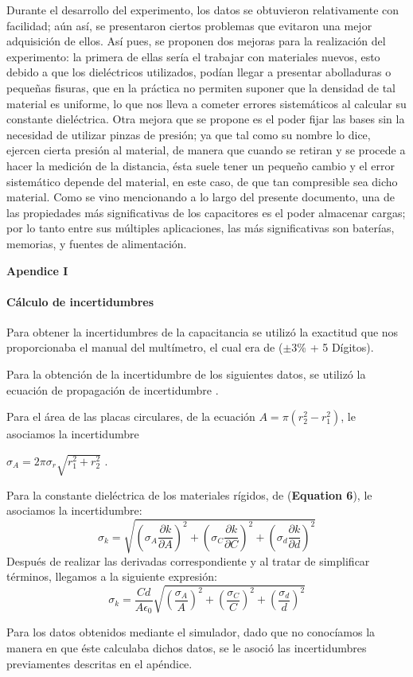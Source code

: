 \documentclass[letterpaper, 11 pt]{article}
\begin{document}
\begin{multicols}{2}
Durante el desarrollo del experimento, los datos se obtuvieron relativamente con facilidad; aún así, se presentaron ciertos problemas que evitaron una mejor adquisición de ellos. Así pues, se proponen dos mejoras para la realización del experimento: la primera de ellas sería el trabajar con materiales nuevos, esto debido a que los dieléctricos utilizados, podían llegar a presentar abolladuras o pequeñas fisuras, que en la práctica no permiten suponer que la densidad de tal material es uniforme, lo que nos lleva a cometer errores sistemáticos al calcular su constante dieléctrica. Otra mejora que se propone es el poder fijar las bases sin la necesidad de utilizar pinzas de presión; ya que tal como su nombre lo dice, ejercen cierta presión al material, de manera que cuando se retiran y se procede a hacer la medición de la distancia, ésta suele tener un pequeño cambio y el error sistemático depende del material, en este caso, de que tan compresible sea dicho material.
Como se vino mencionando a lo largo del presente documento, una de las propiedades más significativas de los capacitores es el poder almacenar cargas; por lo tanto entre sus múltiples aplicaciones, las más significativas son baterías, memorias, y fuentes de alimentación.


\nocite{*}


\appendix
\textbf{Apendice I}
\paragraph{Cálculo de incertidumbres}

Para obtener la incertidumbres de la capacitancia se utilizó la exactitud que nos proporcionaba el manual del multímetro, el cual era de ($\pm$3\% + 5 Dígitos).


Para la obtención de la incertidumbre de los siguientes datos, se utilizó la ecuación de propagación de incertidumbre \cite{bevi2002}.


Para el área de las placas circulares, de la ecuación $A=\pi (r_2^2-r_1^2)$, le asociamos la incertidumbre 

$\sigma_A=2\pi \sigma_r\sqrt{r_1^2+r_2^2}$ .

Para la constante dieléctrica de los materiales rígidos, de (\textbf{Equation 6}), le asociamos la incertidumbre:
$$\sigma_k=\sqrt{\left(\sigma_A \frac{\partial k}{\partial A}\right)^2+\left(\sigma_C \frac{\partial k}{\partial C}\right)^2+\left(\sigma_d \frac{\partial k}{\partial d}\right)^2}$$
Después de realizar las derivadas correspondiente y al tratar de simplificar términos, llegamos a la siguiente expresión:
$$\sigma_k=\frac{Cd}{A\epsilon_0 }\sqrt{\left(\frac{\sigma_A}{A}\right)^2+\left(\frac{\sigma_C}{C}\right)^2+\left(\frac{\sigma_d}{d}\right)^2}$$

Para los datos obtenidos mediante el simulador, dado que no conocíamos la manera en que éste calculaba dichos datos, se le asoció las incertidumbres previamentes descritas en el apéndice.

\end{multicols}
\end{document}
